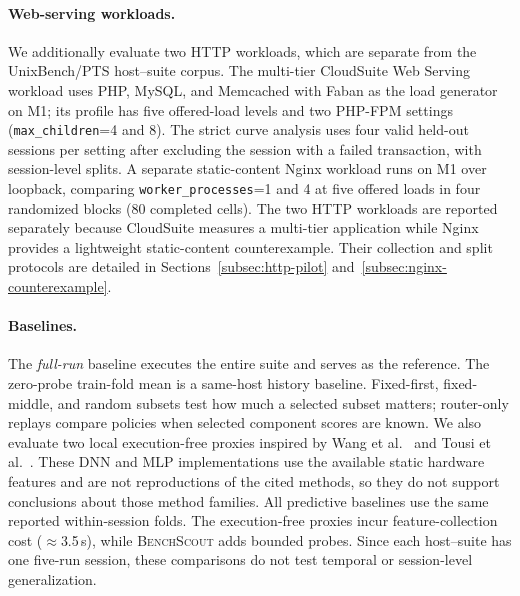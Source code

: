 \documentclass[sigconf, review, anonymous, balance=false]{acmart}
\newcommand{\ourmethod}{\textsc{BenchScout}\xspace}
\begin{document}
\paragraph{Web-serving workloads.}
We additionally evaluate two HTTP workloads, which are separate from the UnixBench/PTS host--suite corpus. The multi-tier CloudSuite Web Serving workload uses PHP, MySQL, and Memcached with Faban as the load generator on M1; its profile has five offered-load levels and two PHP-FPM settings (\texttt{max\_children}=4 and 8). The strict curve analysis uses four valid held-out sessions per setting after excluding the session with a failed transaction, with session-level splits. A separate static-content Nginx workload runs on M1 over loopback, comparing \texttt{worker\_processes}=1 and 4 at five offered loads in four randomized blocks (80 completed cells). The two HTTP workloads are reported separately because CloudSuite measures a multi-tier application while Nginx provides a lightweight static-content counterexample. Their collection and split protocols are detailed in Sections~\ref{subsec:http-pilot} and~\ref{subsec:nginx-counterexample}.

\paragraph{Baselines.}
The \emph{full-run} baseline executes the entire suite and serves as the reference.
The zero-probe train-fold mean is a same-host history baseline. Fixed-first, fixed-middle, and random subsets test how much a selected subset matters; router-only replays compare policies when selected component scores are known. We also evaluate two local execution-free proxies inspired by Wang et al.~\cite{wang2019predicting} and Tousi et al.~\cite{tousi2022comparative}. These DNN and MLP implementations use the available static hardware features and are not reproductions of the cited methods, so they do not support conclusions about those method families.
All predictive baselines use the same reported within-session folds. The execution-free proxies incur feature-collection cost ($\approx$3.5\,s), while \ourmethod{} adds bounded probes. Since each host--suite has one five-run session, these comparisons do not test temporal or session-level generalization.



\end{document}
